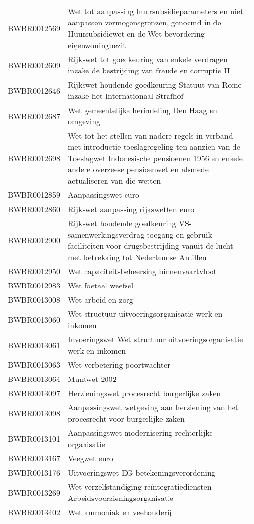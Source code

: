 \begin{longtable}{lp{}}
BWBR0012569 & Wet tot aanpassing huursubsidieparameters en niet aanpassen vermogensgrenzen, genoemd in de Huursubsidiewet en de Wet bevordering eigenwoningbezit \\
BWBR0012609 & Rijkswet tot goedkeuring van enkele verdragen inzake de bestrijding van fraude en corruptie II \\
BWBR0012646 & Rijkswet houdende goedkeuring Statuut van Rome inzake het Internationaal Strafhof \\
BWBR0012687 & Wet gemeentelijke herindeling Den Haag en omgeving \\
BWBR0012698 & Wet tot het stellen van nadere regels in verband met introductie toeslagregeling ten aanzien van de Toeslagwet Indonesische pensioenen 1956 en enkele andere overzeese pensioenwetten alsmede actualiseren van die wetten \\
BWBR0012859 & Aanpassingswet euro \\
BWBR0012860 & Rijkswet aanpassing rijkswetten euro \\
BWBR0012900 & Rijkswet houdende goedkeuring VS-samenwerkingsverdrag toegang en gebruik faciliteiten voor drugsbestrijding vanuit de lucht met betrekking tot Nederlandse Antillen \\
BWBR0012950 & Wet capaciteitsbeheersing binnenvaartvloot \\
BWBR0012983 & Wet foetaal weefsel \\
BWBR0013008 & Wet arbeid en zorg \\
BWBR0013060 & Wet structuur uitvoeringsorganisatie werk en inkomen \\
BWBR0013061 & Invoeringswet Wet structuur uitvoeringsorganisatie werk en inkomen \\
BWBR0013063 & Wet verbetering poortwachter \\
BWBR0013064 & Muntwet 2002 \\
BWBR0013097 & Herzieningswet procesrecht burgerlijke zaken \\
BWBR0013098 & Aanpassingswet wetgeving aan herziening van het procesrecht voor burgerlijke zaken \\
BWBR0013101 & Aanpassingswet modernisering rechterlijke organisatie \\
BWBR0013167 & Veegwet euro \\
BWBR0013176 & Uitvoeringswet EG-betekeningsverordening \\
BWBR0013269 & Wet verzelfstandiging reïntegratiediensten Arbeidsvoorzieningsorganisatie \\
BWBR0013402 & Wet ammoniak en veehouderij \\

\end{longtable}
